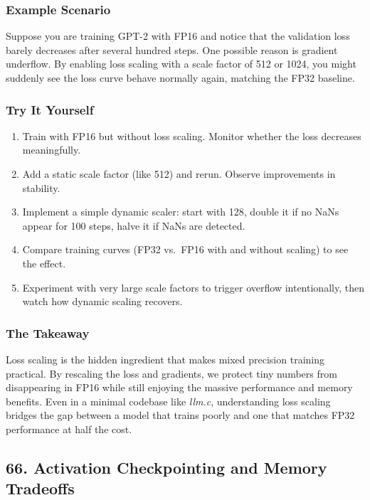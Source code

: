 \documentclass[
  letterpaper,
  DIV=11,
  numbers=noendperiod]{scrreprt}
\providecommand{\tightlist}{%
  \setlength{\itemsep}{0pt}\setlength{\parskip}{0pt}}
\begin{document}
\subsubsection{Example Scenario}\label{example-scenario-5}

Suppose you are training GPT-2 with FP16 and notice that the validation
loss barely decreases after several hundred steps. One possible reason
is gradient underflow. By enabling loss scaling with a scale factor of
512 or 1024, you might suddenly see the loss curve behave normally
again, matching the FP32 baseline.

\subsubsection{Try It Yourself}\label{try-it-yourself-53}

\begin{enumerate}
\def\labelenumi{\arabic{enumi}.}
\tightlist
\item
  Train with FP16 but without loss scaling. Monitor whether the loss
  decreases meaningfully.
\item
  Add a static scale factor (like 512) and rerun. Observe improvements
  in stability.
\item
  Implement a simple dynamic scaler: start with 128, double it if no
  NaNs appear for 100 steps, halve it if NaNs are detected.
\item
  Compare training curves (FP32 vs.~FP16 with and without scaling) to
  see the effect.
\item
  Experiment with very large scale factors to trigger overflow
  intentionally, then watch how dynamic scaling recovers.
\end{enumerate}

\subsubsection{The Takeaway}\label{the-takeaway-54}

Loss scaling is the hidden ingredient that makes mixed precision
training practical. By rescaling the loss and gradients, we protect tiny
numbers from disappearing in FP16 while still enjoying the massive
performance and memory benefits. Even in a minimal codebase like
\emph{llm.c}, understanding loss scaling bridges the gap between a model
that trains poorly and one that matches FP32 performance at half the
cost.

\subsection{66. Activation Checkpointing and Memory
Tradeoffs}\label{activation-checkpointing-and-memory-tradeoffs}
\end{document}
